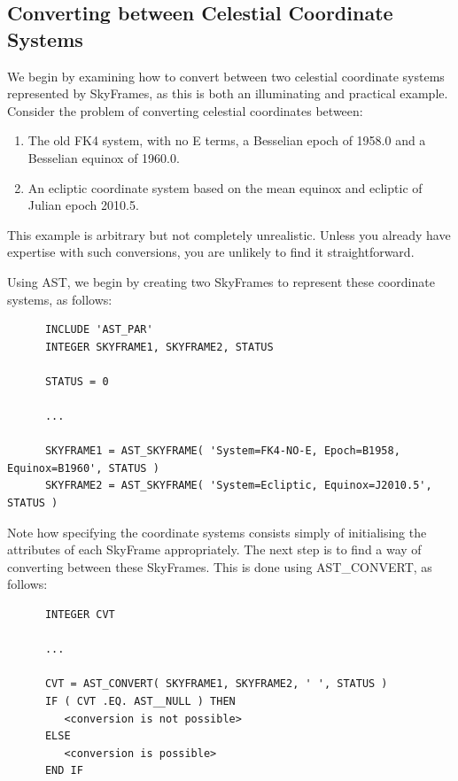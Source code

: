 \documentclass[twoside,11pt]{article}
\newcommand{\htmlref}[2]{#1}
\begin{document}
\subsection{\label{ss:convertingskyframes}Converting between Celestial Coordinate Systems}

We begin by examining how to convert between two celestial coordinate
systems represented by SkyFrames, as this is both an illuminating and
practical example.  Consider the problem of converting celestial
coordinates between:

\begin{enumerate}
\item The old FK4 system, with no E terms, a Besselian epoch of
1958.0 and a Besselian equinox of 1960.0.

\item An ecliptic coordinate system based on the mean equinox and
ecliptic of Julian epoch 2010.5.
\end{enumerate}

This example is arbitrary but not completely unrealistic. Unless you
already have expertise with such conversions, you are unlikely to find
it straightforward.

Using AST, we begin by creating two SkyFrames to represent these
coordinate systems, as follows:

\small
\begin{verbatim}
      INCLUDE 'AST_PAR'
      INTEGER SKYFRAME1, SKYFRAME2, STATUS

      STATUS = 0

      ...

      SKYFRAME1 = AST_SKYFRAME( 'System=FK4-NO-E, Epoch=B1958, Equinox=B1960', STATUS )
      SKYFRAME2 = AST_SKYFRAME( 'System=Ecliptic, Equinox=J2010.5', STATUS )
\end{verbatim}
\normalsize

Note how specifying the coordinate systems consists simply of
initialising the attributes of each \htmlref{SkyFrame}{SkyFrame} appropriately.  The next
step is to find a way of converting between these SkyFrames. This is
done using \htmlref{AST\_CONVERT}{AST_CONVERT}, as follows:

\small
\begin{verbatim}
      INTEGER CVT

      ...

      CVT = AST_CONVERT( SKYFRAME1, SKYFRAME2, ' ', STATUS )
      IF ( CVT .EQ. AST__NULL ) THEN
         <conversion is not possible>
      ELSE
         <conversion is possible>
      END IF
\end{verbatim}
\normalsize
\end{document}
